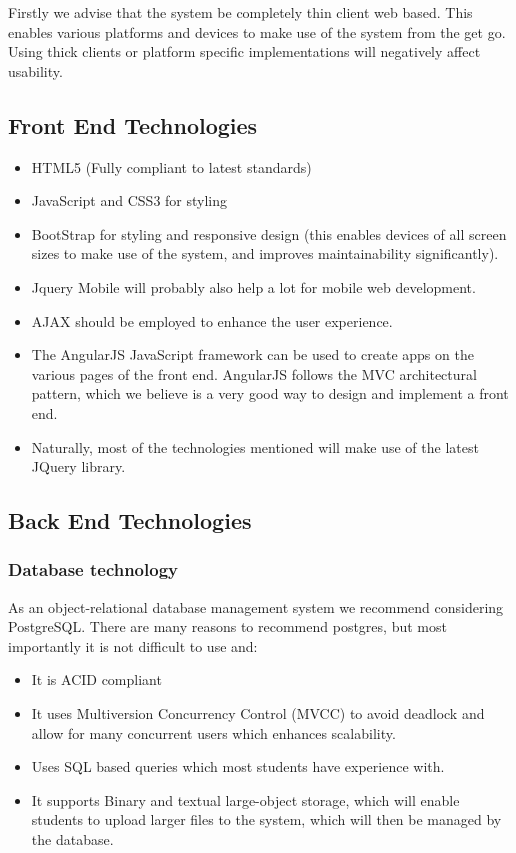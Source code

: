 \begin{description}
	\item Firstly we advise that the system be completely thin client web based. This enables various platforms and devices to make use of the system from the get go. Using thick clients or platform specific implementations will negatively affect usability. 
\end{description}

\subsection{Front End Technologies}

\begin{itemize}
	\item	HTML5 (Fully compliant to latest standards)
	\item	JavaScript and CSS3 for styling
	\item	BootStrap for styling and responsive design (this enables devices of all screen sizes to make use of the system, and improves maintainability significantly). 
	\item	Jquery Mobile will probably also help a lot for mobile web development.
	\item	AJAX should be employed to enhance the user experience. 
	\item	The AngularJS JavaScript framework can be used to create apps on the various pages of the front end. AngularJS follows the MVC architectural pattern, which we believe is a very good way to design and implement a front end.
	\item	Naturally, most of the technologies mentioned will make use of the latest JQuery library. 
\end{itemize}

\subsection{Back End Technologies}

\subsubsection{Database technology}

As an object-relational database management system we recommend considering PostgreSQL. There are many reasons to recommend postgres, but most importantly it is not difficult to use and:

\begin{itemize}
\item	It is ACID compliant
\item	It uses Multiversion Concurrency Control (MVCC) to avoid deadlock and allow for many concurrent users which enhances scalability. 
\item	Uses SQL based queries which most students have experience with. 
\item	It supports Binary and textual large-object storage, which will enable students to upload larger files to the system, which will then be managed by the database. 
\end{itemize}

